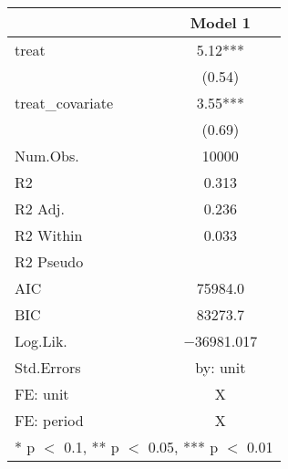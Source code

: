 \begin{table}
\centering
\begin{tabular}[t]{lc}
\toprule
  & Model 1\\
\midrule
treat & \num{5.12}***\\
 & (\num{0.54})\\
treat\_covariate & \num{3.55}***\\
 & (\num{0.69})\\
\midrule
Num.Obs. & \num{10000}\\
R2 & \num{0.313}\\
R2 Adj. & \num{0.236}\\
R2 Within & \num{0.033}\\
R2 Pseudo & \\
AIC & \num{75984.0}\\
BIC & \num{83273.7}\\
Log.Lik. & \num{-36981.017}\\
Std.Errors & by: unit\\
FE: unit & X\\
FE: period & X\\
\bottomrule
\multicolumn{2}{l}{\rule{0pt}{1em}* p $<$ 0.1, ** p $<$ 0.05, *** p $<$ 0.01}\\
\end{tabular}
\end{table}
